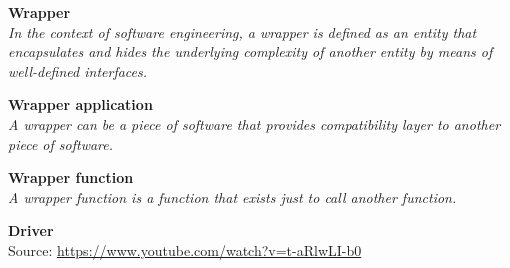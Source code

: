 \textbf{Wrapper} \\
\textit{In the context of software engineering, a wrapper is defined as an entity that encapsulates and hides the underlying complexity of another entity by means of well-defined interfaces.}


\textbf{Wrapper application} \\
\textit{A wrapper can be a piece of software that provides compatibility layer to another piece of software.}

\textbf{Wrapper function} \\
\textit{A wrapper function is a function that exists just to call another function. }


\textbf{Driver} \\
Source: \url{https://www.youtube.com/watch?v=t-aRlwLI-b0}

